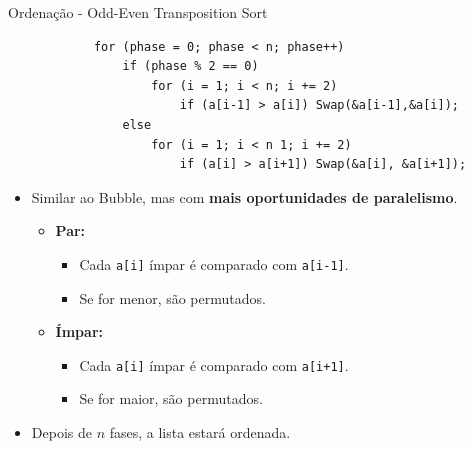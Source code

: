 	\begin{frame}[fragile]{Ordenação - Odd-Even Transposition Sort}
		\begin{verbatim}
			for (phase = 0; phase < n; phase++) 
				if (phase % 2 == 0)
					for (i = 1; i < n; i += 2)
						if (a[i-1] > a[i]) Swap(&a[i-1],&a[i]); 
				else
					for (i = 1; i < n 1; i += 2)
						if (a[i] > a[i+1]) Swap(&a[i], &a[i+1]);
		\end{verbatim}
				\pause
		\begin{itemize}
			\item Similar ao Bubble, mas com \textbf{mais oportunidades de paralelismo}.
			\setlength\itemsep{0.3em}
			\begin{itemize}
				\setlength\itemsep{0.2em}
				\item \textbf{Par:} 
				\begin{itemize}
					\item Cada {\tt a[i]} ímpar é comparado com {\tt a[i-1]}. 
					\item Se for menor, são permutados.
				\end{itemize}
				\item \textbf{Ímpar:} 
				\begin{itemize}
					\item Cada {\tt a[i]} ímpar é comparado com {\tt a[i+1]}. 
					\item Se for maior, são permutados.
				\end{itemize}
			\end{itemize}
			\item Depois de $n$ fases, a lista estará ordenada.
		\end{itemize}
\end{frame}

